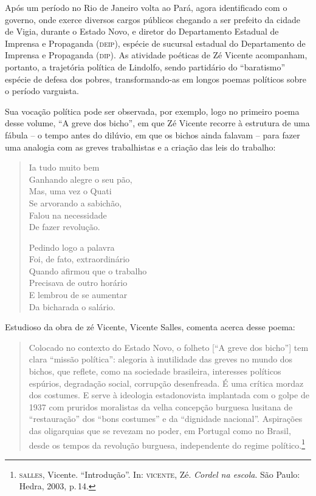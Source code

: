 Após um
período no Rio de Janeiro volta ao Pará, agora identificado com o
governo, onde exerce diversos cargos públicos chegando a ser prefeito
da cidade de Vigia, durante o Estado Novo, e diretor do Departamento
Estadual de Imprensa e Propaganda (\textsc{deip}), espécie de sucursal estadual
do Departamento de Imprensa e Propaganda (\textsc{dip}). 
As atividade poéticas de Zé Vicente acompanham, portanto, a
trajetória política de Lindolfo, sendo partidário do
``baratismo'' espécie de defesa dos pobres, transformando-as 
em longos poemas políticos sobre o período varguista.

Sua vocação política pode ser observada, por exemplo, logo no primeiro poema desse volume,
``A greve dos bicho'', em que Zé Vicente recorre à estrutura de uma fábula -- o tempo antes do dilúvio, em que os bichos ainda falavam -- para fazer uma analogia com as greves trabalhistas e a criação das leis do trabalho:

\begin{verse}
Ia tudo muito bem\\
Ganhando alegre o seu pão,\\
Mas, uma vez o Quati\\
Se arvorando a sabichão,\\
Falou na necessidade\\
De fazer revolução.

Pedindo logo a palavra\\
Foi, de fato, extraordinário\\
Quando afirmou que o trabalho \\
Precisava de outro horário\\
E lembrou de se aumentar \\
Da bicharada o salário.
\end{verse}

Estudioso da obra de zé Vicente, Vicente Salles, comenta acerca desse poema:

\begin{quote}
Colocado no contexto do Estado Novo, o folheto [``A greve dos bicho''] tem clara “missão
política”: alegoria à inutilidade das greves no mundo dos bichos, que
reflete, como na sociedade brasileira, interesses políticos espúrios,
degradação social, corrupção desenfreada. É uma crítica mordaz dos
costumes. E serve à ideologia estadonovista implantada com o golpe de
1937 com pruridos moralistas da velha concepção burguesa lusitana de
“restauração” dos “bons costumes” e da “dignidade nacional”.
Aspirações das oligarquias que se revezam no poder, em Portugal como
no Brasil, desde os tempos da revolução burguesa, independente do
regime político.\footnote{\textsc{salles}, Vicente. ``Introdução''. In: \textsc{vicente}, Zé. \textit{Cordel na escola}. São Paulo: Hedra, 2003, p.\,14.}
\end{quote}

